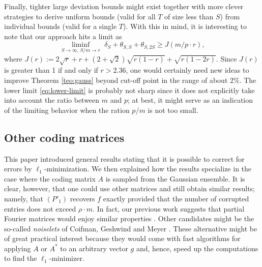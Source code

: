 \documentclass[11pt]{article}
\newcommand{\<}{\langle}
\renewcommand{\>}{\rangle}
\newcommand{\goto}{\rightarrow}
\numberwithin{equation}{section}
\begin{document}
Finally, tighter large deviation bounds might exist together with more
clever strategies to derive uniform bounds (valid for all $T$ of size
less than $S$) from individual bounds (valid for a single $T$).  With
this in mind, it is interesting to note that our approach hits a limit
as
\begin{equation}
  \label{eq:lower-limit}
  \liminf_{S \goto \infty, \, S/m \goto r} \,\, 
\delta_S + \theta_{S,S} + \theta_{S,2S}
\ge J(m/p \cdot r),
\end{equation}
where $J(r) := 2\sqrt{r} + r + (2 + \sqrt{2})\sqrt{r(1-r)} +
\sqrt{r(1-2r)}$.  Since $J(r)$ is greater than 1 if and only if $r >
2.36$, one would certainly need new ideas to improve Theorem
\ref{teo:gauss} beyond cut-off point in the range of about 2\%. The
lower limit \eqref{eq:lower-limit} is probably not sharp since it does
not explicitly take into account the ratio between $m$ and $p$; at
best, it might serve as an indication of the limiting behavior when
the ration $p/m$ is not too small.


\subsection{Other coding matrices}

This paper introduced general results stating that it is possible to
correct for errors by $\ell_1$-minimization. We then explained how the
results specialize in the case where the coding matrix $A$ is sampled
from the Gaussian ensemble. It is clear, however, that one could use
other matrices and still obtain similar results; namely, that $(P'_1)$
recovers $f$ exactly provided that the number of corrupted entries
does not exceed $\rho \cdot m$.  In fact, our previous work suggests
that partial Fourier matrices would enjoy similar properties
\cite{RandomBP,OptimalRecovery}. Other candidates might be the
so-called {\em noiselets} of Coifman, Geshwind and Meyer
\cite{Noiselets}. These alternative might be of great practical
interest because they would come with fast algorithms for applying $A$
or $A^*$ to an arbitrary vector $g$ and, hence, speed up the
computations to find the $\ell_1$-minimizer.
\end{document}
